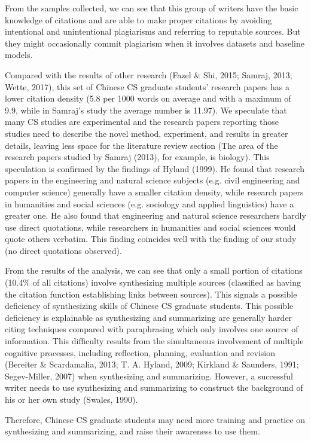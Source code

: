 From the samples collected, we can see that this group of writers have the basic knowledge of citations and are able to make proper citations by avoiding intentional and unintentional plagiarisms and referring to reputable sources. But they might occasionally commit plagiarism when it involves datasets and baseline models.

Compared with the results of other research (Fazel \& Shi, 2015; Samraj, 2013; Wette, 2017), this set of Chinese CS graduate students’ research papers has a lower citation density (5.8 per 1000 words on average and with a maximum of 9.9, while in Samraj’s study the average number is 11.97). We speculate that many CS studies are experimental and the research papers reporting those studies need to describe the novel method, experiment, and results in greater details, leaving less space for the literature review section (The area of the research papers studied by Samraj (2013), for example, is biology). This speculation is confirmed by the findings of Hyland (1999). He found that research papers in the engineering and natural science subjects (e.g. civil engineering and computer science) generally have a smaller citation density, while research papers in humanities and social sciences (e.g. sociology and applied linguistics) have a greater one. He also found that engineering and natural science researchers hardly use direct quotations, while researchers in humanities and social sciences would quote others verbatim. This finding coincides well with the finding of our study (no direct quotations observed).

From the results of the analysis, we can see that only a small portion of citations (10.4\% of all citations) involve synthesizing multiple sources (classified as having the citation function establishing links between sources). This signals a possible deficiency of synthesizing skills of Chinese CS graduate students. This possible deficiency is explainable as synthesizing and summarizing are generally harder citing techniques compared with paraphrasing which only involves one source of information. This difficulty results from the simultaneous involvement of multiple cognitive processes, including reflection, planning, evaluation and revision (Bereiter \& Scardamalia, 2013; T. A. Hyland, 2009; Kirkland \& Saunders, 1991; Segev-Miller, 2007) when synthesizing and summarizing. However, a successful writer needs to use synthesizing and summarizing to construct the background of his or her own study (Swales, 1990).

Therefore, Chinese CS graduate students may need more training and practice on synthesizing and summarizing, and raise their awareness to use them.

